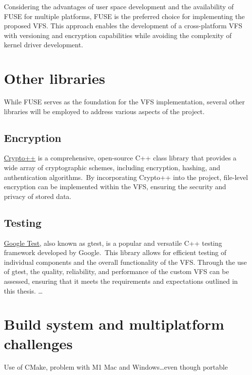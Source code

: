 Considering the advantages of user space development and the availability of FUSE for multiple platforms, FUSE is the preferred choice for implementing the proposed VFS.
This approach enables the development of a cross-platform VFS with versioning and encryption capabilities while avoiding the complexity of kernel driver development.

\section{Other libraries}\label{sec:other-libraries-analysis}

While FUSE serves as the foundation for the VFS implementation, several other libraries will be employed to address various aspects of the project.

\subsection{Encryption}\label{subsec:encryption-analysis}

\href{https://www.cryptopp.com/}{Crypto++} is a comprehensive, open-source C++ class library that provides a wide array of cryptographic schemes, including encryption, hashing, and authentication algorithms.\ By incorporating Crypto++ into the project, file-level encryption can be implemented within the VFS, ensuring the security and privacy of stored data.

\subsection{Testing}\label{subsec:gtest}

\href{https://github.com/google/googletest}{Google Test}, also known as gtest, is a popular and versatile C++ testing framework developed by Google.\ This library allows for efficient testing of individual components and the overall functionality of the VFS. Through the use of gtest, the quality, reliability, and performance of the custom VFS can be assessed, ensuring that it meets the requirements and expectations outlined in this thesis.
\ldots

\section{Build system and multiplatform challenges}\label{sec:build-system-and-multiplatform-challenges}

Use of CMake, problem with M1 Mac and Windows\ldots even though portable
